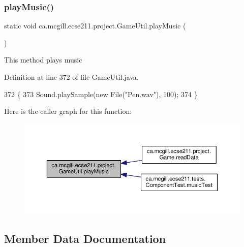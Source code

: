 \subsubsection{\texorpdfstring{play\+Music()}{playMusic()}}
{\footnotesize\ttfamily static void ca.\+mcgill.\+ecse211.\+project.\+Game\+Util.\+play\+Music (\begin{DoxyParamCaption}{ }\end{DoxyParamCaption})\hspace{0.3cm}{\ttfamily [static]}}

This method plays music 

Definition at line 372 of file Game\+Util.\+java.


\begin{DoxyCode}
372                                  \{
373     Sound.playSample(\textcolor{keyword}{new} File(\textcolor{stringliteral}{"Pen.wav"}), 100);
374   \}
\end{DoxyCode}
Here is the caller graph for this function\+:\nopagebreak
\begin{figure}[H]
\begin{center}
\leavevmode
\includegraphics[width=350pt]{classca_1_1mcgill_1_1ecse211_1_1project_1_1_game_util_a38f0e4fdf048d1c265a4b5fc712588f3_icgraph}
\end{center}
\end{figure}


\subsection{Member Data Documentation}
\mbox{\label{classca_1_1mcgill_1_1ecse211_1_1project_1_1_game_util_afc9ecf0a8a18c0abea79086801d8425a}} 
